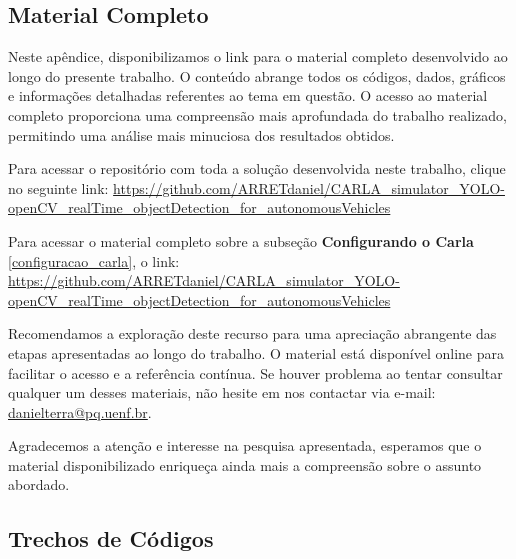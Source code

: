 \documentclass[
	12pt,				%
	oneside, %
	a4paper,			%
	english,			%
	french,				%
	spanish,			%
	brazil				%
	]{abntex2}
\begin{document}
\begin{apendicesenv} 

\partapendices 

\chapter{Material Completo} \label{apendices} 
Neste apêndice, disponibilizamos o link para o material completo desenvolvido ao longo do presente trabalho. O conteúdo abrange todos os códigos, dados, gráficos e informações detalhadas referentes ao tema em questão. O acesso ao material completo proporciona uma compreensão mais aprofundada do trabalho realizado, permitindo uma análise mais minuciosa dos resultados obtidos.

Para acessar o repositório com toda a solução desenvolvida neste trabalho, clique no seguinte link: \url{https://github.com/ARRETdaniel/CARLA_simulator_YOLO-openCV_realTime_objectDetection_for_autonomousVehicles}

Para acessar o material completo sobre a subseção \textbf{Configurando o Carla} \ref{configuracao_carla}, o link: \url{https://github.com/ARRETdaniel/CARLA_simulator_YOLO-openCV_realTime_objectDetection_for_autonomousVehicles}


Recomendamos a exploração deste recurso para uma apreciação abrangente das etapas apresentadas ao longo do trabalho. O material está disponível online para facilitar o acesso e a referência contínua. Se houver problema ao tentar consultar qualquer um desses materiais, não hesite em nos contactar via e-mail: \href{mailto:danielterra@pq.uenf.br}{danielterra@pq.uenf.br}.

Agradecemos a atenção e interesse na pesquisa apresentada, esperamos que o material disponibilizado enriqueça ainda mais a compreensão sobre o assunto abordado.

\section{Trechos de Códigos}


\end{apendicesenv}
\end{document}

